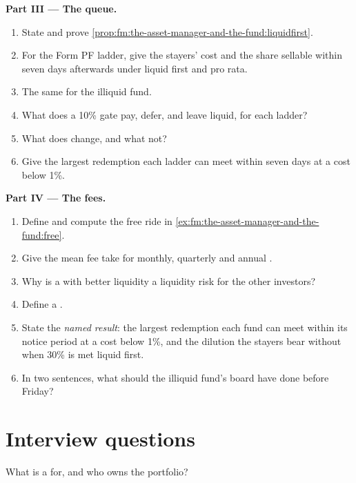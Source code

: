 \begin{problem}
\medskip\noindent\textbf{Part III --- The queue.}
\begin{enumerate}[resume]
\item State and prove \cref{prop:fm:the-asset-manager-and-the-fund:liquidfirst}.
\item For the Form PF ladder, give the stayers' cost and the share sellable within seven days afterwards under liquid first and pro rata.
\item The same for the illiquid fund.
\item What does a 10\% gate pay, defer, and leave liquid, for each ladder?
\item What does  change, and what not?
\item Give the largest redemption each ladder can meet within seven days at a cost below 1\%.
\end{enumerate}

\medskip\noindent\textbf{Part IV --- The fees.}
\begin{enumerate}[resume]
\item Define  and compute the free ride in \cref{ex:fm:the-asset-manager-and-the-fund:free}.
\item Give the mean fee take for monthly, quarterly and annual .
\item Why is a  with better liquidity a liquidity risk for the other investors?
\item Define a .
\item State the \emph{named result}: the largest redemption each fund can meet within its notice period at a cost below 1\%, and the dilution the
stayers bear without  when 30\% is met liquid first.
\item In two sentences, what should the illiquid fund's board have done before Friday?
\end{enumerate}
\end{problem}

\section{Interview questions}

\begin{interviewq}\label{iq:fm:the-asset-manager-and-the-fund:1}
What is a  for, and who owns the portfolio?
\end{interviewq}

